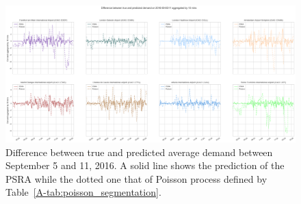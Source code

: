 \documentclass[]{elsarticle}
\begin{document}
\begin{figure}
    \includegraphics[width=\textwidth]{prediction_last_week}
    \caption{Difference between true and predicted average demand between September 5 and 11, 2016. A solid line shows the prediction of the \acs{PSRA} while the dotted one that of Poisson process defined by Table~\ref{A-tab:poisson_segmentation}.}
    \label{fig:pred_last_week}
\end{figure}
\end{document}
